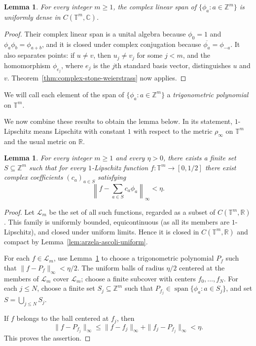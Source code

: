 \documentclass[11pt]{amsart}
\newtheorem{lemma}[theorem]{Lemma}
\theoremstyle{definition}
\newcommand{\T}{\mathbb T}
\newcommand{\Z}{\mathbb Z}
\begin{document}
\begin{lemma}
\label{lem:trigonometric-stone-weierstrass}
For every integer $m\geq1$, the complex linear span of
$\{\phi_a:a\in\Z^m\}$ is uniformly dense in $C(\T^m,\mathbb C)$.
\end{lemma}

\begin{proof}
Their complex linear span is a unital algebra because
$\phi_0=1$ and $\phi_a\phi_b=\phi_{a+b}$, and it is closed under complex
conjugation because $\overline{\phi_a}=\phi_{-a}$.  It also separates
points: if $u\neq v$, then $u_j\neq v_j$ for some $j<m$, and the homomorphism
$\phi_{e_j}$, where $e_j$ is the $j$th standard basis vector, distinguishes
$u$ and $v$.
Theorem~\ref{thm:complex-stone-weierstrass} now applies.
\end{proof}

We will call each element of the span of $\{\phi_a:a\in\Z^m\}$ a
\emph{trigonometric polynomial} on $\T^m$.

We now combine these results to obtain the lemma below.
In its statement, $1$-Lipschitz means Lipschitz with constant $1$ with respect
to the metric $\rho_\infty$ on $\T^m$ and the usual metric on $\mathbb R$.

\begin{lemma}\label{lem:uniform-frequency-set}
For every integer $m\geq1$ and every $\eta>0$, there exists a finite set
$S\subseteq\Z^m$ such that for every $1$-Lipschitz function
$f:\T^m\to[0,1/2]$ there exist complex coefficients $(c_a)_{a\in S}$
satisfying
\[
 \left\|f-\sum_{a\in S}c_a\phi_a\right\|_\infty<\eta.
\]
\end{lemma}

\begin{proof}
Let $\mathcal L_m$ be the set of all such functions, regarded as a subset of
$C(\T^m,\mathbb R)$.  This family is uniformly bounded, equicontinuous (as
all its members are $1$-Lipschitz), and closed under uniform limits.  Hence it
is closed in $C(\T^m,\mathbb R)$ and compact by
Lemma~\ref{lem:arzela-ascoli-uniform}.

For each $f\in\mathcal L_m$, use
Lemma~\ref{lem:trigonometric-stone-weierstrass} to choose a trigonometric
polynomial $P_f$ such that $\|f-P_f\|_\infty<\eta/2$.  The uniform balls of
radius $\eta/2$ centered at the members of $\mathcal L_m$ cover
$\mathcal L_m$; choose a finite subcover with centers
$f_0,\ldots,f_N$.
For each $j\leq N$, choose a finite set $S_j\subseteq\Z^m$ such that
$P_{f_j}\in\operatorname{span}\{\phi_a:a\in S_j\}$, and set
$S=\bigcup_{j\leq N} S_j$.

If $f$ belongs to the ball centered at $f_j$, then
\[
 \|f-P_{f_j}\|_\infty
 \leq \|f-f_j\|_\infty+\|f_j-P_{f_j}\|_\infty<\eta.
\]
This proves
the assertion.
\end{proof}
\end{document}
